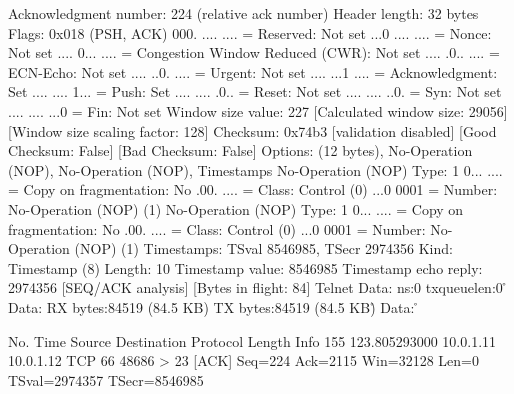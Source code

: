     Acknowledgment number: 224    (relative ack number)
    Header length: 32 bytes
    Flags: 0x018 (PSH, ACK)
        000. .... .... = Reserved: Not set
        ...0 .... .... = Nonce: Not set
        .... 0... .... = Congestion Window Reduced (CWR): Not set
        .... .0.. .... = ECN-Echo: Not set
        .... ..0. .... = Urgent: Not set
        .... ...1 .... = Acknowledgment: Set
        .... .... 1... = Push: Set
        .... .... .0.. = Reset: Not set
        .... .... ..0. = Syn: Not set
        .... .... ...0 = Fin: Not set
    Window size value: 227
    [Calculated window size: 29056]
    [Window size scaling factor: 128]
    Checksum: 0x74b3 [validation disabled]
        [Good Checksum: False]
        [Bad Checksum: False]
    Options: (12 bytes), No-Operation (NOP), No-Operation (NOP), Timestamps
        No-Operation (NOP)
            Type: 1
                0... .... = Copy on fragmentation: No
                .00. .... = Class: Control (0)
                ...0 0001 = Number: No-Operation (NOP) (1)
        No-Operation (NOP)
            Type: 1
                0... .... = Copy on fragmentation: No
                .00. .... = Class: Control (0)
                ...0 0001 = Number: No-Operation (NOP) (1)
        Timestamps: TSval 8546985, TSecr 2974356
            Kind: Timestamp (8)
            Length: 10
            Timestamp value: 8546985
            Timestamp echo reply: 2974356
    [SEQ/ACK analysis]
        [Bytes in flight: 84]
Telnet
    Data: ns:0 txqueuelen:0 \r\n
    Data:           RX bytes:84519 (84.5 KB)  TX bytes:84519 (84.5 KB)\r\n
    Data: \r\n

No.     Time           Source                Destination           Protocol Length Info
    155 123.805293000  10.0.1.11             10.0.1.12             TCP      66     48686 > 23 [ACK] Seq=224 Ack=2115 Win=32128 Len=0 TSval=2974357 TSecr=8546985

